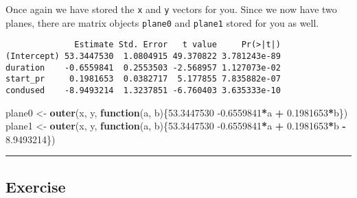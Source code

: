 \documentclass[
]{book}
\newenvironment{Shaded}{\begin{snugshade}}{\end{snugshade}}
\newcommand{\ControlFlowTok}[1]{\textcolor[rgb]{0.13,0.29,0.53}{\textbf{#1}}}
\newcommand{\DataTypeTok}[1]{\textcolor[rgb]{0.13,0.29,0.53}{#1}}
\newcommand{\FloatTok}[1]{\textcolor[rgb]{0.00,0.00,0.81}{#1}}
\newcommand{\KeywordTok}[1]{\textcolor[rgb]{0.13,0.29,0.53}{\textbf{#1}}}
\newcommand{\NormalTok}[1]{#1}
\newcommand{\OperatorTok}[1]{\textcolor[rgb]{0.81,0.36,0.00}{\textbf{#1}}}
\newcommand{\StringTok}[1]{\textcolor[rgb]{0.31,0.60,0.02}{#1}}
\begin{document}
Once again we have stored the \texttt{x} and \texttt{y} vectors for you. Since we now have two planes, there are matrix objects \texttt{plane0} and \texttt{plane1} stored for you as well.

\begin{Shaded}
\end{Shaded}

\begin{verbatim}
              Estimate Std. Error   t value     Pr(>|t|)
(Intercept) 53.3447530  1.0804915 49.370822 3.781243e-89
duration    -0.6559841  0.2553503 -2.568957 1.127073e-02
start_pr     0.1981653  0.0382717  5.177855 7.835882e-07
condused    -8.9493214  1.3237851 -6.760403 3.635333e-10
\end{verbatim}

\begin{Shaded}
\begin{Highlighting}[]
\NormalTok{plane0 <-}\StringTok{ }\KeywordTok{outer}\NormalTok{(x, y, }\ControlFlowTok{function}\NormalTok{(a, b)\{}\FloatTok{53.3447530} \FloatTok{-0.6559841}\OperatorTok{*}\NormalTok{a }\OperatorTok{+}\StringTok{ }
\StringTok{                                      }\FloatTok{0.1981653}\OperatorTok{*}\NormalTok{b\})}
\NormalTok{plane1 <-}\StringTok{ }\KeywordTok{outer}\NormalTok{(x, y, }\ControlFlowTok{function}\NormalTok{(a, b)\{}\FloatTok{53.3447530} \FloatTok{-0.6559841}\OperatorTok{*}\NormalTok{a }\OperatorTok{+}
\StringTok{                                      }\FloatTok{0.1981653}\OperatorTok{*}\NormalTok{b }\OperatorTok{-}\StringTok{ }\FloatTok{8.9493214}\NormalTok{\})}
\end{Highlighting}
\end{Shaded}

\begin{center}\rule{0.5\linewidth}{0.5pt}\end{center}

\hypertarget{exercise-11}{%
\subsection*{Exercise}\label{exercise-11}}
\end{document}
